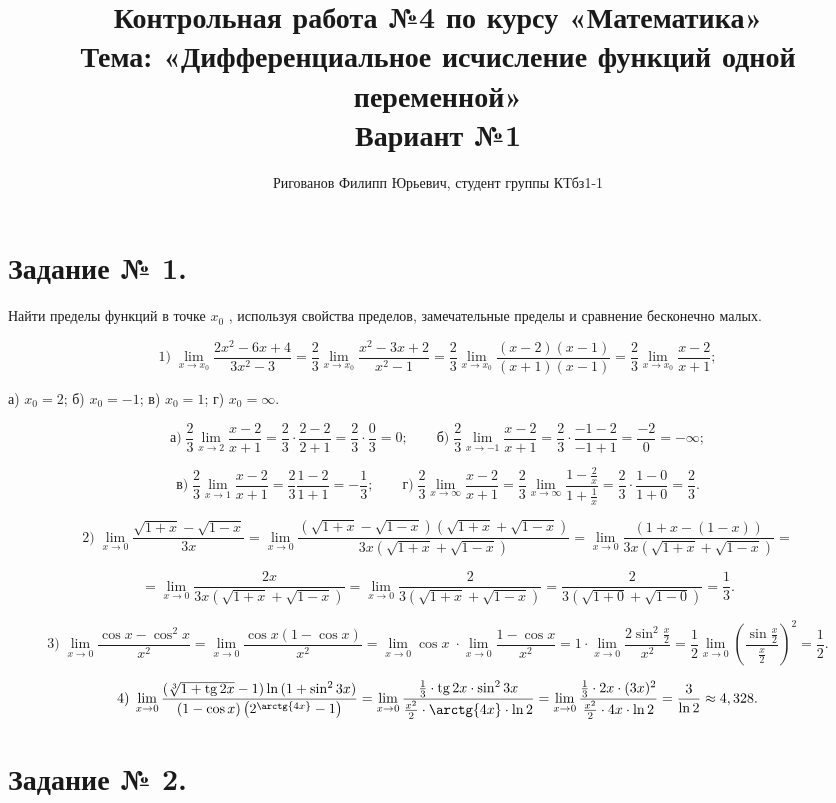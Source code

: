 \documentclass{article}
\title{Контрольная работа №4 по курсу «Математика»\\
Тема: «Дифференциальное исчисление функций одной переменной»\\
Вариант №1}
\author{Ригованов Филипп Юрьевич, студент группы КТбз1-1}
\newcommand{\tg}{\mathop{\rm tg}\nolimits}
\begin{document}
\date{}
\maketitle
\section*{Задание № 1.}
Найти пределы функций в точке $x_0$ , используя свойства пределов, замечательные
пределы и сравнение бесконечно малых.

$$1)\; \lim_{x\to x_0}\frac{2x^2-6x+4}{3x^2-3}=\frac{2}{3}\lim_{x\to x_0}\frac{x^2-3x+2}{x^2-1}=\frac{2}{3}\lim_{x\to x_0}\frac{(x-2)(x-1)}{(x+1)(x-1)}=\frac{2}{3}\lim_{x\to x_0}\frac{x-2}{x+1};$$

а) $x_0=2$; б) $x_0=-1$; в) $x_0=1$; г) $x_0=\infty$.

$$\textit{а})\;\frac{2}{3}\lim_{x\to2}\frac{x-2}{x+1}=\frac{2}{3}\cdot\frac{2-2}{2+1}=\frac{2}{3}\cdot\frac{0}{3}=0;\qquad\textit{б})\;\frac{2}{3}\lim_{x\to{-1}}\frac{x-2}{x+1}=\frac{2}{3}\cdot\frac{-1-2}{-1+1}=\frac{-2}{0}=-\infty;$$

$$\textit{в})\;\frac{2}{3}\lim_{x\to1}\frac{x-2}{x+1}=\frac{2}{3}\frac{1-2}{1+1}=-\frac{1}{3};\qquad\textit{г})\;\frac{2}{3}\lim_{x\to\infty}\frac{x-2}{x+1}=\frac{2}{3}\lim_{x\to\infty}\frac{1-\frac{2}{x}}{1+\frac{1}{x}}=\frac{2}{3}\cdot\frac{1-0}{1+0}=\frac{2}{3}.$$

$$2)\; \lim_{x\to0}\frac{\sqrt{1+x}-\sqrt{1-x}}{3x}=\lim_{x\to0}\frac{(\sqrt{1+x}-\sqrt{1-x})(\sqrt{1+x}+\sqrt{1-x})}{3x(\sqrt{1+x}+\sqrt{1-x})}=\lim_{x\to0}\frac{(1+x-(1-x))}{3x(\sqrt{1+x}+\sqrt{1-x})}=$$

$$=\lim_{x\to0}\frac{2x}{3x(\sqrt{1+x}+\sqrt{1-x})}=\lim_{x\to0}\frac{2}{3(\sqrt{1+x}+\sqrt{1-x})}=\frac{2}{3(\sqrt{1+0}+\sqrt{1-0})}=\frac{1}{3}.$$

$$3)\; \lim_{x\to0}\frac{\cos{x}-\cos^2{x}}{x^2}=\lim_{x\to0}\frac{\cos{x}(1-\cos{x})}{x^2}=\lim_{x\to0}\cos{x}\;\cdot\lim_{x\to0}\frac{1-\cos{x}}{x^2}=1\cdot\lim_{x\to0}\frac{2\sin^2{\frac{x}{2}}}{x^2}=\frac{1}{2}\lim_{x\to0}\left(\frac{\sin{\frac{x}{2}}}{\frac{x}{2}}\right)^2=\frac{1}{2}.$$

$$4)\; \lim_{x\to0}\frac{\left(\sqrt[3]{1+\tg{2x}}-1\right)\ln{(1+\sin^2{3x})}}{(1-\cos{x})\left(2^{\arctg{4x}}-1\right)}=\lim_{x\to0}\frac{\frac{1}{3}\cdot\tg{2x}\cdot\sin^2{3x}}{\frac{x^2}{2}\cdot\arctg{4x}\cdot\ln2}=\lim_{x\to0}\frac{\frac{1}{3}\cdot2x\cdot(3x)^2}{\frac{x^2}{2}\cdot4x\cdot\ln2}=\frac{3}{\ln2}\approx4,328.$$

\section*{Задание № 2.}
\end{document}
